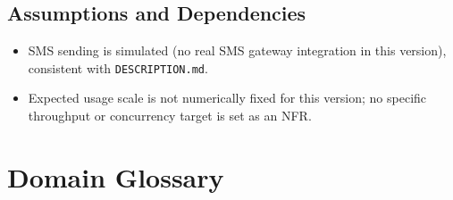 \documentclass[11pt,a4paper]{article}
\begin{document}
\subsection{Assumptions and Dependencies}

\begin{itemize}[leftmargin=1.2cm]

\item
SMS sending is simulated (no real SMS gateway integration in this
version), consistent with \texttt{DESCRIPTION.md}.

\item
Expected usage scale is not numerically fixed for this version; no
specific throughput or concurrency target is set as an NFR.

\end{itemize}

\section{Domain Glossary}
\label{sec:glossary}
\end{document}
